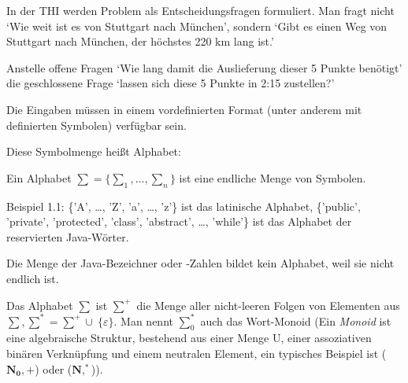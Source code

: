 \documentclass[11pt, a4paper]{article}
\begin{document}
\begin{flushleft}

    In der THI werden Problem als Entscheidungsfragen formuliert. Man fragt nicht `Wie weit ist es von Stuttgart nach München', sondern `Gibt es einen Weg von Stuttgart nach München, der höchstes 220 km lang ist.'
    \vspace{1em}

    Anstelle offene Fragen `Wie lang damit die Auslieferung dieser 5 Punkte benötigt' die geschlossene Frage `lassen sich diese 5 Punkte in 2:15 zustellen?'
    \vspace{1em}

    Die Eingaben müssen in einem vordefinierten Format (unter anderem mit definierten Symbolen) verfügbar sein.
    \vspace{1em}

    Diese Symbolmenge heißt Alphabet:

    \begin{tcolorbox}[title = Definition 1.1]
        Ein Alphabet \( \sum = \{\sum_1,\ldots,\sum_n\}\) ist eine endliche Menge von Symbolen.
    \end{tcolorbox}

    \begin{tcolorbox}[title = Beispiel 1.1, colbacktitle = white, coltitle = black, colframe = black, colback = white, fonttitle = \bfseries]

        Beispiel 1.1: \{'A', \ldots, 'Z', 'a', \ldots, 'z'\} ist das latinische Alphabet, \{'public', 'private', 'protected', 'class', 'abstract', \ldots, 'while'\} ist das Alphabet der reservierten Java-Wörter.
    \end{tcolorbox}
    \vspace{1em}

    Die Menge der Java-Bezeichner oder -Zahlen bildet kein Alphabet, weil sie nicht endlich ist.

    \begin{tcolorbox}[title = Definition 1.2]
        Das Alphabet \(\sum\) ist \(\sum^+\) die Menge aller nicht-leeren Folgen von Elementen aus \linebreak  \(\sum, \sum^* = \sum^+ \cup \: \{\varepsilon\}\). Man nennt \(\sum^*_0\) auch das Wort-Monoid (Ein \emph{Monoid} ist eine algebraische Struktur, bestehend aus einer Menge U, einer assoziativen binären Verknüpfung und einem neutralen Element, ein typisches Beispiel ist (\(\mathbf{N_0}, +\)) oder (\(\mathbf{N}, ^*\))).
    \end{tcolorbox}



\end{flushleft}
\end{document}
